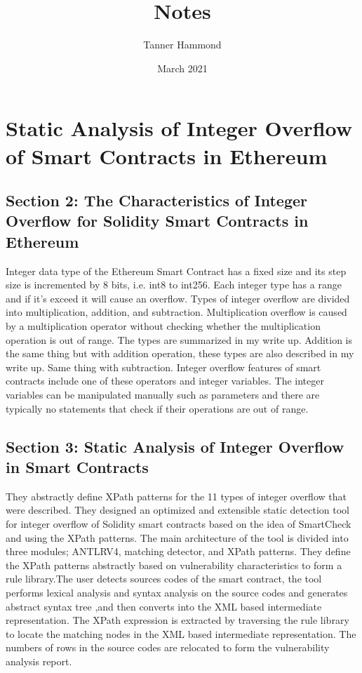 \documentclass{article}
\title{Notes}
\author{Tanner Hammond}
\date{March 2021}
\begin{document}
\maketitle

\section{Static Analysis of Integer Overflow of Smart Contracts in Ethereum \cite{Static}}

\subsection{Section 2: The Characteristics of Integer Overflow for Solidity Smart Contracts in Ethereum}
Integer data type of the Ethereum Smart Contract has a fixed size and its step size is incremented by 8 bits, i.e. int8 to int256. Each integer type has a range and if it's exceed it will cause an overflow. Types of integer overflow are divided into multiplication, addition, and subtraction. Multiplication overflow is caused by a multiplication operator without checking whether the multiplication operation is out of range. The types are summarized in my write up. Addition is the same thing but with addition operation, these types are also described in my write up. Same thing with subtraction. Integer overflow features of smart contracts include one of these operators and integer variables. The integer variables can be manipulated manually such as parameters and there are typically no statements that check if their operations are out of range.

\subsection{Section 3: Static Analysis of Integer Overflow in Smart Contracts}
They abstractly define XPath patterns for the 11 types of integer overflow that were described. They designed an optimized and extensible static detection tool for integer overflow of Solidity smart contracts based on the idea of SmartCheck and using the XPath patterns. The main architecture of the tool is divided into three modules; ANTLRV4, matching detector, and XPath patterns. They define the XPath patterns abstractly based on vulnerability characteristics to form a rule library.The user detects sources codes of the smart contract, the tool performs lexical analysis and syntax analysis on the source codes and generates abstract syntax tree ,and then converts into the XML based intermediate representation. The XPath expression is extracted by traversing the rule library to locate the matching nodes in the XML based intermediate representation. The numbers of rows in the source codes are relocated to form the vulnerability analysis report.
\end{document}
